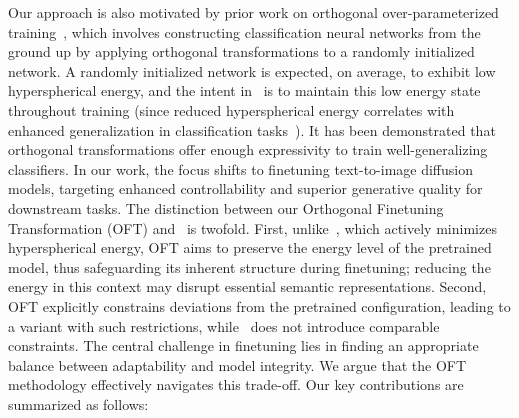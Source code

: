 Our approach is also motivated by prior work on orthogonal over-parameterized training~\cite{liu2021orthogonal}, which involves constructing classification neural networks from the ground up by applying orthogonal transformations to a randomly initialized network. A randomly initialized network is expected, on average, to exhibit low hyperspherical energy, and the intent in~\cite{liu2021orthogonal} is to maintain this low energy state throughout training (since reduced hyperspherical energy correlates with enhanced generalization in classification tasks~\cite{liu2018learning,lin2020regularizing}). It has been demonstrated that orthogonal transformations offer enough expressivity to train well-generalizing classifiers. In our work, the focus shifts to finetuning text-to-image diffusion models, targeting enhanced controllability and superior generative quality for downstream tasks. The distinction between our Orthogonal Finetuning Transformation (OFT) and~\cite{liu2021orthogonal} is twofold. First, unlike~\cite{liu2021orthogonal}, which actively minimizes hyperspherical energy, OFT aims to preserve the energy level of the pretrained model, thus safeguarding its inherent structure during finetuning; reducing the energy in this context may disrupt essential semantic representations. Second, OFT explicitly constrains deviations from the pretrained configuration, leading to a variant with such restrictions, while~\cite{liu2021orthogonal} does not introduce comparable constraints. The central challenge in finetuning lies in finding an appropriate balance between adaptability and model integrity. We argue that the OFT methodology effectively navigates this trade-off. Our key contributions are summarized as follows:


